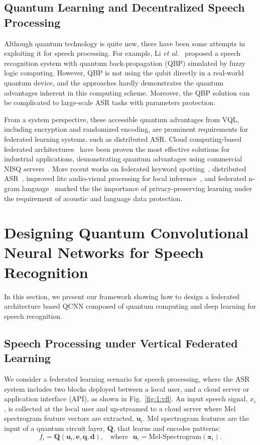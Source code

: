 \documentclass{article}
\begin{document}
\subsection{Quantum Learning and Decentralized Speech Processing}
Although quantum technology is quite new, there have been some attempts in exploiting it for speech processing. For example,  Li \emph{et al.}~\cite{li2002quantum} proposed a speech recognition system with quantum back-propagation (QBP) simulated by fuzzy logic computing. However, QBP is not using the qubit directly in a real-world quantum device, and the approaches hardly demonstrates the quantum advantages inherent in this computing scheme. Moreover, the QBP solution can be complicated to large-scale ASR tasks with parameters protection. 

From a system perspective, these accessible quantum advantages from VQL, including encryption and randomized encoding, are prominent requirements for federated learning systems, such as distributed ASR. Cloud computing-based federated architectures~\cite{yang2019federated} have been proven the most effective solutions for industrial applications, demonstrating quantum advantages using commercial NISQ servers~\cite{ mohseni2017commercialize}.  More recent works on federated keyword spotting~\cite{leroy2019federated}, distributed ASR~\cite{qi2020submodular}, improved lite audio-visual processing for local inference~\cite{chuang2020improved}, and federated n-gram language~\cite{chen2019federated} marked the the importance of privacy-preserving learning under the requirement of acoustic and language data protection. 





\section{Designing Quantum Convolutional Neural Networks for Speech Recognition}
\label{sec:proposal}
In this section, we present our framework showing how to design a federated architecture based QCNN composed of quantum computing and deep learning for speech recognition.

\subsection{Speech Processing under Vertical Federated Learning}
We consider a federated learning scenario for speech processing, where the ASR system includes two blocks deployed between a local user, and a cloud server or application interface (API), as shown in Fig.~\ref{fig:1:vfl}. An input speech signal, $x_i$, is collected at the local user and up-streamed to a cloud server where Mel spectrogram feature vectors are extracted, $\textbf{u}_{i}$. Mel spectrogram features are the input of a quantum circuit layer, $\mathbf{Q}$, that learns and encodes patterns:
\begin{equation}
    f_{i}=\mathbf{Q}(\textbf{u}_{i}, \mathbf{e}, \mathbf{q}, \mathbf{d}),~~~~ \text{where}~~~\textbf{u}_{i} = \text{Mel-Spectrogram}(\textbf{x}_i).
    \label{eq:1:vfl:audio}
\end{equation}
\end{document}
